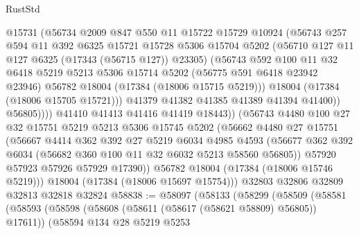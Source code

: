 \begin{lexlean}{RustStd}
\begin{coremodule}
                    @15731
                    (@56734
                      @2009
                      @847
                      @550
                      @11
                      @15722
                      @15729
                      @10924
                      (@56743
                        @257
                        @594
                        @11
                        @392
                        @6325
                        @15721
                        @15728
                        @5306
                        @15704
                        @5202
                        (@56710 @127 @11 @127 @6325 (@17343 (@56715 @127)) @23305)
                        (@56743
                          @592
                          @100
                          @11
                          @32
                          @6418
                          @5219
                          @5213
                          @5306
                          @15714
                          @5202
                          (@56775 @591 @6418 @23942 @23946)
                          @56782
                          @18004
                          (@17384 (@18006 @15715 @5219)))
                        @18004
                        (@17384 (@18006 @15705 @15721)))
                      @41379
                      @41382
                      @41385
                      @41389
                      @41394
                      @41400))
                  @56805))))
          @41410
          @41413
          @41416
          @41419
          @18443))
      (@56743
        @4480
        @100
        @27
        @32
        @15751
        @5219
        @5213
        @5306
        @15745
        @5202
        (@56662
          @4480
          @27
          @15751
          (@56667
            @4414
            @362
            @392
            @27
            @5219
            @6034
            @4985
            @4593
            (@56677 @362 @392 @6034 (@56682 @360 @100 @11 @32 @6032 @5213 @58560 @56805))
            @57920
            @57923
            @57926
            @57929
            @17390))
        @56782
        @18004
        (@17384 (@18006 @15746 @5219)))
      @18004
      (@17384 (@18006 @15697 @15754)))
    @32803
    @32806
    @32809
    @32813
    @32818
    @32824
@58838 := @58097
    (@58133
      (@58299
        (@58509
          (@58581
            (@58593
              (@58598 (@58608 (@58611 (@58617 (@58621 @58809) @56805)) @17611))
              (@58594
                @134
                @28
                @5219
                @5253

\end{coremodule}
\end{lexlean}
